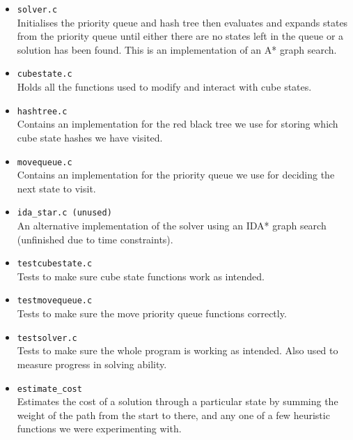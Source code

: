 \documentclass[8pt]{article}
\begin{document}
\begin{minipage}{0.45\textwidth}
    \begin{itemize}
        \item \texttt{solver.c} \\ Initialises the priority queue and hash tree then
        evaluates and expands states from the priority queue until either there are no states
        left in the queue or a solution has been found. This is an
        implementation of an A* graph search.
        \item \texttt{cubestate.c} \\ Holds all the functions used to modify and interact
        with cube states.
        \item \texttt{hashtree.c}\\  Contains an implementation for the red black tree we
        use for storing which cube state hashes we have visited.
        \item \texttt{movequeue.c}\\ Contains an implementation for the priority queue we use
        for deciding the next state to visit.
        \item \texttt{ida\_star.c (unused)}\\ An alternative implementation
        of the solver using an IDA* graph search (unfinished due to time constraints).
        \item \texttt{testcubestate.c}\\ Tests to make sure cube state functions
        work as intended.
        \item \texttt{testmovequeue.c}\\ Tests to make sure the move priority queue
        functions correctly.
        \item \texttt{testsolver.c}\\ Tests to make sure the whole program is working as
        intended. Also used to measure progress in solving ability.
        \item \texttt{estimate\_cost}\\ Estimates the cost of a solution through a particular
        state by summing the weight of the path from the start to there, and any one of a few heuristic functions
        we were experimenting with.


    \end{itemize}
    \end{minipage}%
    \hfill
\end{document}

